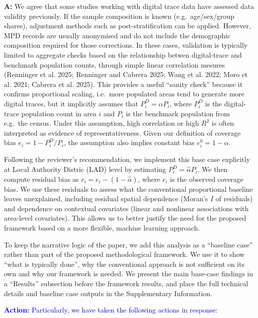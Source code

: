 \documentclass[
  letterpaper,
  DIV=11,
  numbers=noendperiod]{scrartcl}
\begin{document}
\setlength{\leftskip}{0.5cm}\textbf{A:} We agree that some studies
working with digital trace data have assessed data validity previously.
If the sample composition is known (e.g.~age/sex/group shares),
adjustment methods such as post-stratification can be applied. However,
MPD records are usually anonymised and do not include the demographic
composition required for those corrections. In these cases, validation
is typically limited to aggregate checks based on the relationship
betwen digital-trace and benchmark population counts, through simple
linear correlation mesures (Renninger et al. 2025; Renninger and Cabrera
2025; Wang et al. 2022; Moro et al. 2021; Cabrera et al. 2025). This
provides a useful ``sanity check'' because it confirms proportional
scaling, i.e.~more populated areas tend to generate more digital traces,
but it implicitly assumes that \(P_i^D=\alpha P_i\), where \(P_i^D\) is
the digital-trace population count in area \(i\) and \(P_i\) is the
benchmark population from e.g.~the census. Under this assumption, high
correlation or high \(R^2\) is often interpreted as evidence of
representativeness. Given our definition of coverage bias
\(e_i = 1-P_i^D/P_i\), the assumption also implies constant bias
\(e_i^0 = 1-\alpha\).

Following the reviewer's recommendation, we implement this base case
explicitly at Local Authority Distric (LAD) level by estimating
\(P_i^D=\hat{\alpha}P_i\). We then compute residual bias as
\(r_i = e_i - (1-\hat{\alpha})\), where \(e_i\) is the observed coverage
bias. We use these residuals to assess what the conventional
proportional baseline leaves unexplained, including residual spatial
dependence (Moran's \(I\) of residuals) and dependence on contextual
covariates (linear and nonlinear associations with area-level
covariates). This allows us to better justify the need for the proposed
framework based on a more flexible, machine learning approach.

To keep the narrative logic of the paper, we add this analysis as a
``baseline case'' rather than part of the proposed methodological
framework. We use it to show ``what is typically done'', why the
conventional approach is not sufficient on its own and why our framework
is needed. We present the main base-case findings in a ``Results''
subsection before the framework results, and place the full technical
details and baseline case outputs in the Supplementary Information.

\setlength{\leftskip}{0.5cm}\textcolor{blue}{\textbf{Action:} Particularly, we have taken the following actions in response:}
\vspace{-3mm}
\end{document}
